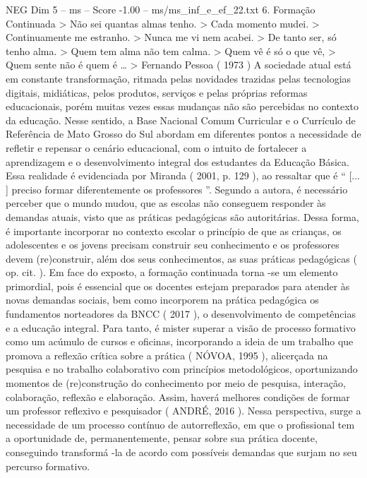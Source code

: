 \begin{textsample}{NEG Dim 5 – ms – Score -1.00 – ms/ms\_inf\_e\_ef\_22.txt}  \label{ex:f5_neg_080}
6.
Formação Continuada > Não sei quantas almas tenho. > Cada momento mudei. > Continuamente me estranho. > Nunca me vi nem acabei. > De tanto ser, só tenho alma. > Quem tem alma não tem calma. > Quem vê é só o que vê, > Quem sente não é quem é … > Fernando Pessoa ( 1973 ) A sociedade atual está em constante transformação, ritmada pelas novidades trazidas pelas tecnologias digitais, midiáticas, pelos produtos, serviços e pelas próprias reformas educacionais, porém muitas vezes essas mudanças não são percebidas no contexto da educação.
Nesse sentido, a Base Nacional Comum Curricular e o Currículo de Referência de Mato Grosso do Sul abordam em diferentes pontos a necessidade de refletir e repensar o cenário educacional, com o intuito de fortalecer a aprendizagem e o desenvolvimento integral dos estudantes da Educação Básica.
Essa realidade é evidenciada por Miranda ( 2001, p. 129 ), ao ressaltar que é “ [... ] preciso formar diferentemente os professores ”.
Segundo a autora, é necessário perceber que o mundo mudou, que as escolas não conseguem responder às demandas atuais, visto que as práticas pedagógicas são autoritárias.
Dessa forma, é importante incorporar no contexto escolar o princípio de que as crianças, os adolescentes e os jovens precisam construir seu conhecimento e os professores devem (re)construir, além dos seus conhecimentos, as suas práticas pedagógicas ( op. cit. ).
Em face do exposto, a formação continuada torna -se um elemento primordial, pois é essencial que os docentes estejam preparados para atender às novas demandas sociais, bem como incorporem na prática pedagógica os fundamentos norteadores da BNCC ( 2017 ), o desenvolvimento de competências e a educação integral.
Para tanto, é mister superar a visão de processo formativo como um acúmulo de cursos e oficinas, incorporando a ideia de um trabalho que promova a reflexão crítica sobre a prática ( NÓVOA, 1995 ), alicerçada na pesquisa e no trabalho colaborativo com princípios metodológicos, oportunizando momentos de (re)construção do conhecimento por meio de pesquisa, interação, colaboração, reflexão e elaboração.
Assim, haverá melhores condições de formar um professor reflexivo e pesquisador ( ANDRÉ, 2016 ).
Nessa perspectiva, surge a necessidade de um processo contínuo de autorreflexão, em que o profissional tem a oportunidade de, permanentemente, pensar sobre sua prática docente, conseguindo transformá -la de acordo com possíveis demandas que surjam no seu percurso formativo.

\end{textsample}
